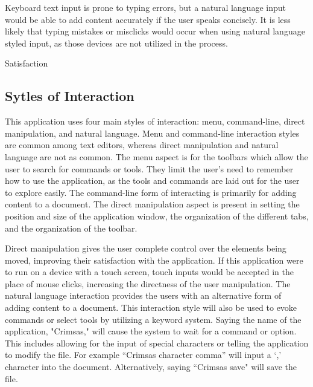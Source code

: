 \documentclass[11pt, oneside]{article}
\begin{document}
Keyboard text input is prone to typing errors, but a natural language input would be able to add content accurately if the user speaks concisely. It is less likely that typing mistakes or misclicks would occur when using natural language styled input, as those devices are not utilized in the process. 

Satisfaction



\subsection{Sytles of Interaction}
This application uses four main styles of interaction: menu, command-line, direct manipulation, and natural language. Menu and command-line interaction styles are common among text editors, whereas direct manipulation and natural language are not as common. The menu aspect is for the toolbars which allow the user to search for commands or tools. They limit the user's need to remember how to use the application, as the tools and commands are laid out for the user to explore easily. The command-line form of interacting is primarily for adding content to a document. The direct manipulation aspect is present in setting the position and size of the application window, the organization of the different tabs, and the organization of the toolbar. 

Direct manipulation gives the user complete control over the elements being moved, improving their satisfaction with the application. If this application were to run on a device with a touch screen, touch inputs would be accepted in the place of mouse clicks, increasing the directness of the user manipulation. The natural language interaction provides the users with an alternative form of adding content to a document. This interaction style will also be used to evoke commands or select tools by utilizing a keyword system. Saying the name of the application, "Crimsas," will cause the system to wait for a command or option. This includes allowing for the input of special characters or telling the application to modify the file. For example ``Crimsas character comma'' will input a `,' character into the document. Alternatively, saying ``Crimsas save" will save the file.


\end{document}
